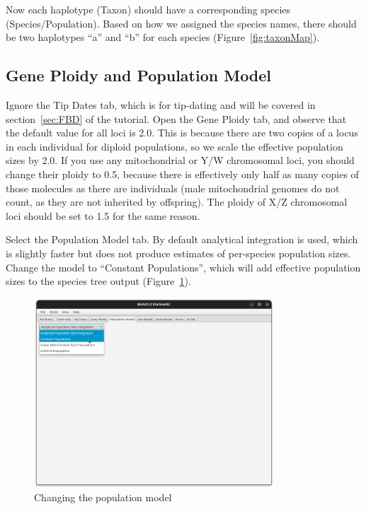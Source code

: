 \documentclass[12pt]{article}
\begin{document}
Now each haplotype (Taxon) should have a corresponding species (Species/Population).
Based on how we assigned the species names, there should be two haplotypes
``a'' and ``b'' for each species (Figure~\ref{fig:taxonMap}).

\subsection{Gene Ploidy and Population Model}
\label{subsec:ploidyAndPopModel}

Ignore the Tip Dates tab, which is for tip-dating and will be covered in
section~\ref{sec:FBD} of the tutorial. Open the Gene Ploidy tab, and observe that the default value
for all loci is 2.0. This is because there are two copies of a locus in each
individual for diploid populations, so we scale the effective population sizes
by 2.0. If you use any mitochondrial or Y/W chromosomal loci, you should
change their ploidy to 0.5, because there is effectively only half as many copies of those molecules as there are individuals (male mitochondrial genomes do not count, as they are not inherited by offspring). The ploidy of X/Z chromosomal loci should be set to 1.5 for the
same reason.

Select the Population Model tab. By default analytical integration is used,
which is slightly faster but does not produce estimates of per-species population sizes.
Change the model to ``Constant Populations'', which will add effective population
sizes to the species tree output (Figure~\ref{fig:constantPopulations}).

\begin{figure}[htb!]
\centering
\includegraphics[width=0.8\textwidth]{figures/constantPopulations.png}
\caption
{Changing the population model}
\label{fig:constantPopulations}
\end{figure}
\end{document}
